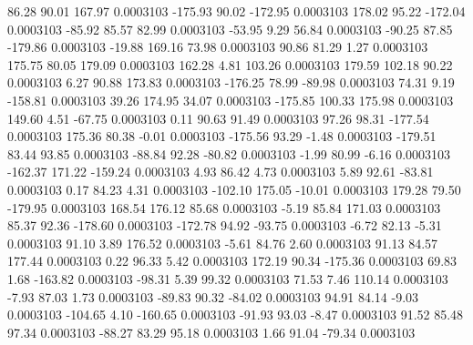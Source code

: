        86.28       90.01      167.97     0.0003103
     -175.93       90.02     -172.95     0.0003103
      178.02       95.22     -172.04     0.0003103
      -85.92       85.57       82.99     0.0003103
      -53.95        9.29       56.84     0.0003103
      -90.25       87.85     -179.86     0.0003103
      -19.88      169.16       73.98     0.0003103
       90.86       81.29        1.27     0.0003103
      175.75       80.05      179.09     0.0003103
      162.28        4.81      103.26     0.0003103
      179.59      102.18       90.22     0.0003103
        6.27       90.88      173.83     0.0003103
     -176.25       78.99      -89.98     0.0003103
       74.31        9.19     -158.81     0.0003103
       39.26      174.95       34.07     0.0003103
     -175.85      100.33      175.98     0.0003103
      149.60        4.51      -67.75     0.0003103
        0.11       90.63       91.49     0.0003103
       97.26       98.31     -177.54     0.0003103
      175.36       80.38       -0.01     0.0003103
     -175.56       93.29       -1.48     0.0003103
     -179.51       83.44       93.85     0.0003103
      -88.84       92.28      -80.82     0.0003103
       -1.99       80.99       -6.16     0.0003103
     -162.37      171.22     -159.24     0.0003103
        4.93       86.42        4.73     0.0003103
        5.89       92.61      -83.81     0.0003103
        0.17       84.23        4.31     0.0003103
     -102.10      175.05      -10.01     0.0003103
      179.28       79.50     -179.95     0.0003103
      168.54      176.12       85.68     0.0003103
       -5.19       85.84      171.03     0.0003103
       85.37       92.36     -178.60     0.0003103
     -172.78       94.92      -93.75     0.0003103
       -6.72       82.13       -5.31     0.0003103
       91.10        3.89      176.52     0.0003103
       -5.61       84.76        2.60     0.0003103
       91.13       84.57      177.44     0.0003103
        0.22       96.33        5.42     0.0003103
      172.19       90.34     -175.36     0.0003103
       69.83        1.68     -163.82     0.0003103
      -98.31        5.39       99.32     0.0003103
       71.53        7.46      110.14     0.0003103
       -7.93       87.03        1.73     0.0003103
      -89.83       90.32      -84.02     0.0003103
       94.91       84.14       -9.03     0.0003103
     -104.65        4.10     -160.65     0.0003103
      -91.93       93.03       -8.47     0.0003103
       91.52       85.48       97.34     0.0003103
      -88.27       83.29       95.18     0.0003103
        1.66       91.04      -79.34     0.0003103
